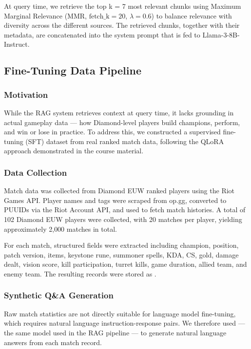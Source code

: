 \documentclass[fleqn,moreauthors,10pt]{ds_report}
\begin{document}
At query time, we retrieve the top k = 7 most relevant chunks using Maximum Marginal Relevance (MMR, $\text{fetch\_k}=20$, $\lambda=0.6$) to balance relevance with diversity across the different sources. The retrieved chunks, together with their metadata, are concatenated into the system prompt that is fed to Llama-3-8B-Instruct.


\subsection*{Fine-Tuning Data Pipeline}

\subsubsection*{Motivation}
While the RAG system retrieves context at query time, it lacks grounding in actual gameplay data — how Diamond-level players build champions, perform, and win or lose in practice. To address this, we constructed a supervised fine-tuning (SFT) dataset from real ranked match data, following the QLoRA approach demonstrated in the course material.

\subsubsection*{Data Collection}
Match data was collected from Diamond EUW ranked players using the Riot Games API. Player names and tags were scraped from op.gg, converted to PUUIDs via the Riot Account API, and used to fetch match histories. A total of 102 Diamond EUW players were collected, with 20 matches per player, yielding approximately 2{,}000 matches in total.

For each match, structured fields were extracted including champion, position, patch version, items, keystone rune, summoner spells, KDA, CS, gold, damage dealt, vision score, kill participation, turret kills, game duration, allied team, and enemy team. The resulting records were stored as .

\subsubsection*{Synthetic Q\&A Generation}
Raw match statistics are not directly suitable for language model fine-tuning, which requires natural language instruction-response pairs. We therefore used  — the same model used in the RAG pipeline — to generate natural language answers from each match record.
\end{document}
